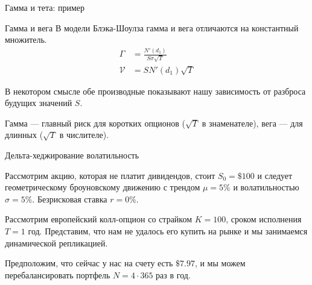 \documentclass{beamer}
\begin{document}
\begin{frame}{Гамма и тета: пример}
\centering
{}
\end{frame}



\begin{frame}{Гамма и вега}
\justify
В модели Блэка-Шоулза гамма и вега отличаются на константный множитель.
\begin{align*}
\Gamma &= \frac{N'(d_1)}{S\sigma\sqrt{T}} \\
\mathcal{V} &= SN'(d_1)\sqrt{T}
\end{align*}

\justify
В некотором смысле обе производные показывают нашу зависимость от разброса будущих значений $S$.

\justify
Гамма --- главный риск для коротких опционов ($\sqrt{T}$ в знаменателе), вега --- для длинных ($\sqrt{T}$ в числителе). 
\end{frame}



\begin{frame}{Дельта-хеджирование волатильность}

\justify
Рассмотрим акцию, которая не платит дивидендов, стоит $S_0=\$100$ и следует 
геометрическому броуновскому движению с трендом $\mu=5\%$ и волатильностью
$\sigma=5\%$. Безрисковая ставка $r=0\%$.

\justify
Рассмотрим европейский колл-опцион со страйком $K=100$, сроком исполнения $T=1$ год. 
Представим, что нам не удалось его купить на рынке и мы занимаемся динамической 
репликацией.

\justify
Предположим, что сейчас у нас на счету есть $\$7.97$, и мы можем 
перебалансировать портфель $N=4\cdot365$ раз в год.

\end{frame}
\end{document}

